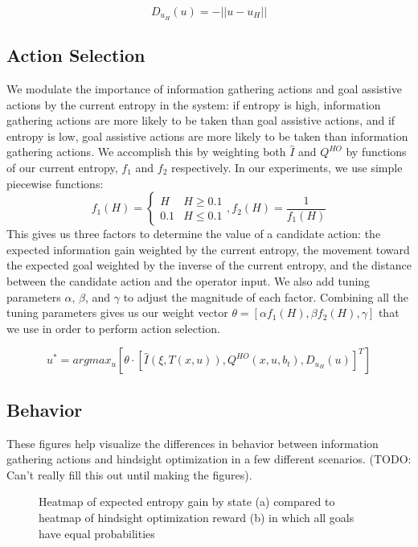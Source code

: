 \documentclass[conference]{IEEEtran}
\begin{document}
\[
D_{u_H}(u) = -||u - u_H||
\]


\subsection{Action Selection}

We modulate the importance of information gathering actions and goal assistive actions by the current entropy in the system: if entropy is high, information gathering actions are more likely to be taken than goal assistive actions, and if entropy is low, goal assistive actions are more likely to be taken than information gathering actions. We accomplish this by weighting both $\hat{I}$ and $Q^{HO}$ by functions of our current entropy, $f_1$ and $f_2$ respectively. In our experiments, we use simple piecewise functions:
\[
f_1(H) = 
\begin{cases}
H & H\geq 0.1 \\
0.1 & H\leq 0.1
\end{cases}
,f_2(H) = \frac{1}{f_1(H)}
\]
This gives us three factors to determine the value of a candidate action: the expected information gain weighted by the current entropy, the movement toward the expected goal weighted by the inverse of the current entropy, and the distance between the candidate action and the operator input. We also add tuning parameters $\alpha$, $\beta$, and $\gamma$ to adjust the magnitude of each factor. Combining all the tuning parameters gives us our weight vector $\theta = [\alpha f_1(H), \beta f_2(H), \gamma]$ that we use in order to perform action selection.

\[
u^* = argmax_u [ \theta \cdot [\hat{I}(\xi, T(x,u)), Q^{HO}(x,u,b_t), D_{u_H}(u)]^T ]
\]

\subsection{Behavior}

These figures help visualize the differences in behavior between information gathering actions and hindsight optimization in a few different scenarios. (TODO: Can't really fill this out until making the figures).

\begin{figure}
\caption{Heatmap of expected entropy gain by state (a) compared to heatmap of hindsight optimization reward (b) in which all goals have equal probabilities}
\label{heatmap1}
\end{figure}
\end{document}
